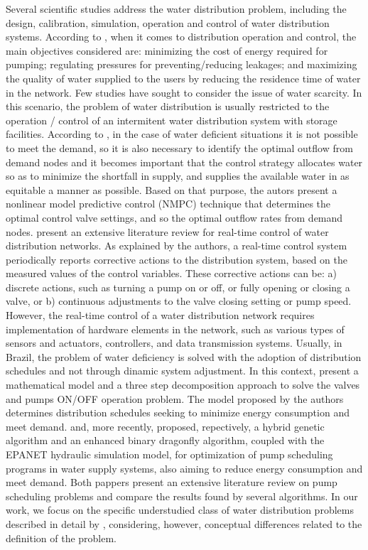 \documentclass{singlecol}
\theoremstyle{TH}{
\newtheorem{lemma}{Lemma}
\newtheorem{theorem}[lemma]{Theorem}
\newtheorem{corrolary}[lemma]{Corrolary}
\newtheorem{conjecture}[lemma]{Conjecture}
\newtheorem{proposition}[lemma]{Proposition}
\newtheorem{claim}[lemma]{Claim}
\newtheorem{stheorem}[lemma]{Wrong Theorem}
\newtheorem{algorithm}{Algorithm}
}
\theoremstyle{THrm}{
\newtheorem{definition}{Definition}[section]
\newtheorem{question}{Question}[section]
\newtheorem{remark}{Remark}
\newtheorem{scheme}{Scheme}
}
\theoremstyle{THhit}{
\newtheorem{case}{Case}[section]
}
\begin{document}
Several scientific studies address the water distribution problem, including the design, calibration, simulation, operation and control of water distribution systems. According to \cite{SankarEtAl2015}, when it comes to distribution operation and control, the main objectives considered are: minimizing the cost of energy required for pumping; regulating pressures for preventing/reducing leakages; and maximizing the quality of water supplied to the users by reducing the residence time of water in the network. Few studies have sought to consider the issue of water scarcity. In this scenario, the problem of water distribution is usually restricted to the operation / control of an intermitent water distribution system with storage facilities. According to \cite{SankarEtAl2015}, in the case of water deficient situations it is not possible to meet the demand, so it is also necessary to identify the optimal outflow from demand nodes and it becomes important that the control strategy allocates water so as to minimize the shortfall in supply, and supplies the available water in as equitable a manner as possible. Based on that purpose, the autors present a nonlinear model predictive control (NMPC) technique that determines the optimal control valve settings, and so the optimal outflow rates from demand nodes. \cite{CreacoEtAl2019} present an extensive literature review for real-time control of water distribution networks. As explained by the authors, a real-time control system periodically reports corrective actions to the distribution system, based on the measured values of the control variables. These corrective actions can be: a) discrete actions, such as turning a pump on or off, or fully opening or closing a valve, or b) continuous adjustments to the valve closing setting or pump speed. However, the real-time control of a water distribution network requires implementation of hardware elements in the network, such as various types of sensors and actuators, controllers, and data transmission systems. Usually, in Brazil, the problem of water deficiency is solved with the adoption of distribution schedules and not through dinamic system adjustment. In this context, \cite{KurianEtAl2018} present a mathematical model and a three step decomposition approach to solve the valves and pumps ON/OFF operation problem. The model proposed by the authors determines distribution schedules seeking to minimize energy consumption and meet demand. \cite{LunaEtAl2019} and, more recently, \cite{JafariEtAl2021} proposed, repectively, a hybrid genetic algorithm and an enhanced binary dragonfly algorithm, coupled with the EPANET hydraulic simulation model, for optimization of pump scheduling programs in water supply systems, also aiming to reduce energy consumption and meet demand. Both pappers present an extensive literature review on pump scheduling problems and \cite{JafariEtAl2021} compare the results found by several algorithms. In our work, we focus on the specific understudied class of water distribution problems described in detail by \cite{KurianEtAl2018}, considering, however, conceptual differences related to the definition of the problem.
\end{document}
